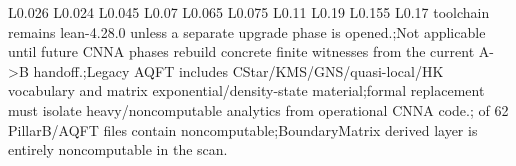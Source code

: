 \begin{longtable}{L{0.026\linewidth} L{0.024\linewidth} L{0.045\linewidth} L{0.07\linewidth} L{0.065\linewidth} L{0.075\linewidth} L{0.11\linewidth} L{0.19\linewidth} L{0.155\linewidth} L{0.17\linewidth}}
toolchain remains lean-4.28.0 unless a separate upgrade phase is opened.;\newline Not applicable until future CNNA phases rebuild concrete finite witnesses from the current A->B handoff.;\newline Legacy AQFT includes CStar/\allowbreak{}KMS/\allowbreak{}GNS/\allowbreak{}quasi-local/\allowbreak{}HK vocabulary and matrix exponential/\allowbreak{}density-state material;\newline formal replacement must isolate heavy/\allowbreak{}noncomputable analytics from operational CNNA code.; of 62 PillarB/\allowbreak{}AQFT files contain noncomputable;\newline BoundaryMatrix derived layer is entirely noncomputable in the scan.\\
\hline
\addlinespace[0.24em]

\end{longtable}
